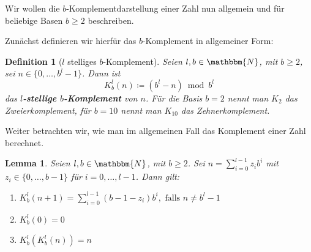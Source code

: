 \documentclass{article}
\newcommand{\N}{\mathbbm{N}} %
\newtheorem{definition}[satz]{Definition}
\newtheorem{lemma}[satz]{Lemma}
\begin{document}
  Wir wollen die $b$-Komplementdarstellung einer Zahl nun allgemein und für beliebige Basen $b \geq 2$ beschreiben.

  Zunächst definieren wir hierfür das $b$-Komplement in allgemeiner Form:

  \begin{definition}[$l$ stelliges $b$-Komplement] \label{def:b-Komplement}
    Seien $l,b \in \N$, mit $b\geq 2$, sei $n \in \{0, \dots, b^l-1\}$.
    Dann ist 
    \[K^l_b(n) \coloneq (b^l-n) \bmod b^l\]
    das \textbf{$l$-stellige $b$-Komplement} von $n$.
    Für die Basis $b=2$ nennt man $K_2$ das Zweierkomplement, für $b=10$ nennt man $K_{10}$ das Zehnerkomplement.
  \end{definition}
  
  Weiter betrachten wir, wie man im allgemeinen Fall das Komplement einer Zahl berechnet.

  \begin{lemma} \label{lem:b-Komplement_berechnen}
    Seien $l,b \in \N$, mit $b\geq 2$. Sei $n=\displaystyle\sum_{i=0}^{l-1} z_ib^i$ mit $z_i \in \{0, \dots, b-1\}$ für $i = 0, \dots, l-1$.
    Dann gilt:
    \begin{enumerate}[label=(\roman*)]
      \item $K^l_b(n+1) = \displaystyle\sum_{i=0}^{l-1}(b-1-z_i)b^i, \text{ falls } n\neq b^l-1$ \label{lem:b-Komplement_berechnen_Berechnung}
      \item $K^l_b(0)=0$ \label{lem:b-Komplement_berechnen_von0} 
      \item $K^l_b(K^l_b(n))=n$ \label{lem:b-Komplement_berechnen_KomplementKomplement} 
    \end{enumerate}
  \end{lemma}
\end{document}
